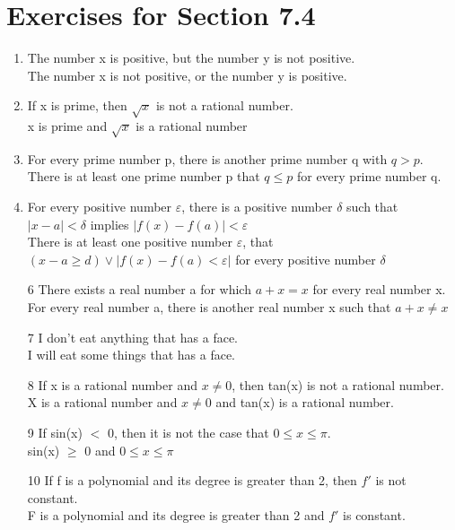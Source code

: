 \documentclass[12pt]{article}
\begin{document}
\section*{Exercises for Section 7.4}
\begin{enumerate}
	\item The number x is positive, but the number y is not positive.\\
	    The number x is not positive, or the number y is positive.
	\item If x is prime, then $\sqrt{x}$ is not a rational number.\\
	    x is prime and $\sqrt{x}$ is a rational number
	\item For every prime number p, there is another prime number q with $q>p$.\\
	    There is at least one prime number p that $q\le p$ for every prime number q.
	\item For every positive number $\varepsilon$, there is a positive number $\delta$ such that $|x-a| < \delta$ implies $|f(x) - f(a)| < \varepsilon$\\
	    There is at least one positive number $\varepsilon$, that $(x-a \ge d) \lor |f(x) - f(a) < \varepsilon|$ for every positive number $\delta$
	\item  [6] There exists a real number a for which $a+x=x$ for every real number x.\\
	    For every real number a, there is another real number x such that $a+x\ne x$
	\item  [7] I don't eat anything that has a face.\\
	    I will eat some things that has a face.
	\item  [8] If x is a rational number and $x \ne 0$, then tan(x) is not a rational number.\\
	    X is a rational number and $x\ne 0$ and tan(x) is a rational number.
	\item  [9] If sin(x) $<$ 0, then it is not the case that $0 \le x \le \pi$.\\
	    sin(x) $\ge$ 0 and $0 \le x \le \pi$
	\item  [10] If f is a polynomial and its degree is greater than 2, then $f'$ is not constant.\\
	    F is a polynomial and its degree is greater than 2 and $f'$ is constant.

\end{enumerate}
\end{document}
